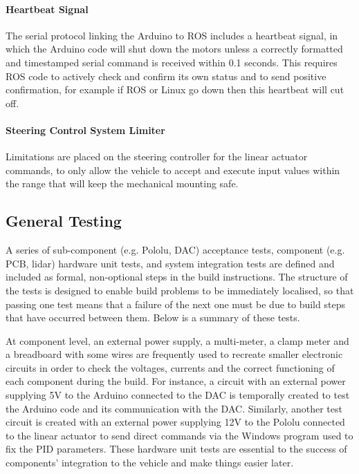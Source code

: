 \documentclass[a4paper]{article}
\begin{document}
	\paragraph{Heartbeat Signal} The serial protocol linking the Arduino to ROS includes a heartbeat signal, in which the Arduino code will shut down the motors unless a correctly formatted and timestamped serial command is received within 0.1 seconds. This requires ROS code to actively check and confirm its own status and to send positive confirmation, for example if ROS or Linux go down then this heartbeat will cut off.
	
	\paragraph{Steering Control System Limiter} Limitations are placed on the steering controller for the linear actuator commands, to only allow the vehicle to accept and execute input values within the range that will keep the mechanical mounting safe.
	
	
	\subsection{ General Testing}\label{h.wbekh9ay82yu}
	
	A series of sub-component (e.g. Pololu, DAC) acceptance tests, component (e.g. PCB, lidar) hardware unit tests, and system integration tests are defined and included as formal, non-optional steps in the build instructions.  The structure of the tests is designed to enable build problems to be immediately localised, so that passing one test means that a failure of the next one must be due to build steps that have occurred between them. Below is a summary of these tests.
	
	At component level, an external power supply, a multi-meter, a clamp meter and a breadboard with some wires are frequently used to recreate smaller electronic circuits in order to check the voltages, currents and the correct functioning of each component during the build. For instance, a circuit with an external power supplying 5V to the Arduino connected to the DAC is temporally created to test the Arduino code and its communication with the DAC.  Similarly, another test circuit is created with an external power supplying 12V to the Pololu connected to the linear actuator to send direct commands via the Windows program used to fix the PID parameters. These hardware unit tests are essential to the success of components' integration to the vehicle and make things easier later. 
	
\end{document}
